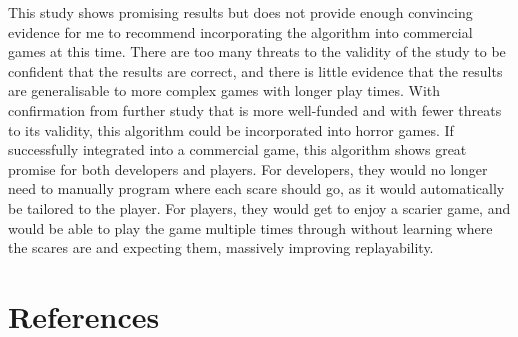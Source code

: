 \documentclass[12pt,a4paper]{article}\usepackage[]{graphicx}\usepackage[]{color}
\begin{document}
This study shows promising results but does not provide enough convincing evidence for me to recommend incorporating the algorithm into commercial games at this time.
There are too many threats to the validity of the study to be confident that the results are correct, and there is little evidence that the results are generalisable to more complex games with longer play times.
With confirmation from further study that is more well-funded and with fewer threats to its validity, this algorithm could be incorporated into horror games.
If successfully integrated into a commercial game, this algorithm shows great promise for both developers and players.
For developers, they would no longer need to manually program where each scare should go, as it would automatically be tailored to the player.
For players, they would get to enjoy a scarier game, and would be able to play the game multiple times through without learning where the scares are and expecting them, massively improving replayability.


\section{References}
\footnotesize
\end{document}
